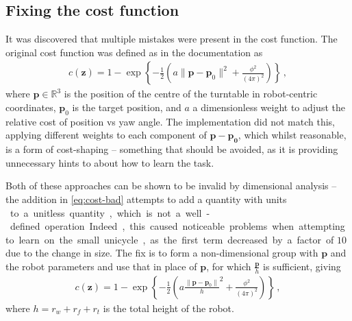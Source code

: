 \documentclass[main.tex]{subfiles}
\begin{document}
\subsection{Fixing the cost function}
	\label{sec:cost-function}
	It was discovered that multiple mistakes were present in the cost function. The original cost function was defined as in the documentation as
	\begin{align}
		c(\bm z) = 1 - \exp\left\{-\frac{1}{2}\left(a\|\bm{p} - \bm p_0\|^2+ \frac{\phi^2}{(4\pi)^2}\right)\right\} \,, \label{eq:cost-bad}
	\end{align}
	where $\bm{p} \in \mathbb{R}^3$ is the position of the centre of the turntable in robot-centric coordinates, $\bm{p}_0$ is the target position, and $a$ a dimensionless weight to adjust the relative cost of position vs yaw angle.
	The implementation did not match this, applying different weights to each component of $\bm{p} - \bm{p_0}$, which whilst reasonable, is a form of cost-shaping -- something that should be avoided, as it is providing unnecessary hints to {\Pilco} about how to learn the task.

	Both of these approaches can be shown to be invalid by dimensional analysis -- the addition in \cref{eq:cost-bad} attempts to add a quantity with units \si{\meter\square} to a unitless quantity, which is not a well-defined operation.
	Indeed, this caused noticeable problems when attempting to learn on the small unicycle, as the first term decreased by a factor of $10$ due to the change in size.
	The fix is to form a non-dimensional group with $\bm{p}$ and the robot parameters and use that in place of $\bm{p}$, for which $\frac{\bm{p}}{h}$ is sufficient, giving
	\begin{align}
		c(\bm z) = 1 - \exp\left\{-\frac{1}{2}\left(a\frac{\|\bm{p} - \bm p_0\|}{h}^2+ \frac{\phi^2}{(4\pi)^2}\right)\right\} \,, \label{eq:correct-cost}
	\end{align}
	where $h = r_w + r_f + r_t$ is the total height of the robot.
\end{document}
